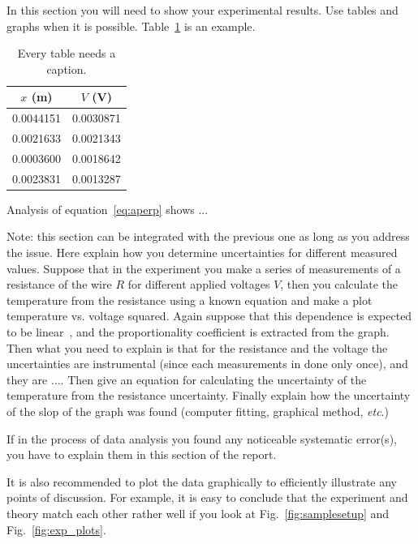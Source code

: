 \documentclass[letterpaper,12pt]{article}
\begin{document}
	In this section you will need to show your experimental results. Use tables and
	graphs when it is possible. Table~\ref{tbl:bins} is an example.
	
	\begin{table}[ht]
		\begin{center}
			\caption{Every table needs a caption.}
			\label{tbl:bins} %
			\begin{tabular}{|cc|} 
				\hline
				\multicolumn{1}{|c}{$x$ (m)} & \multicolumn{1}{c|}{$V$ (V)} \\
				\hline
				0.0044151 &   0.0030871 \\
				0.0021633 &   0.0021343 \\
				0.0003600 &   0.0018642 \\
				0.0023831 &   0.0013287 \\
				\hline
			\end{tabular}
		\end{center}
	\end{table}
	
	Analysis of equation~\ref{eq:aperp} shows ...
	
	Note: this section can be integrated with the previous one as long as you
	address the issue. Here explain how you determine uncertainties for different
	measured values. Suppose that in the experiment you make a series of
	measurements of a resistance of the wire $R$ for different applied voltages
	$V$, then you calculate the temperature from the resistance using a known
	equation and make a plot  temperature vs. voltage squared. Again suppose that
	this dependence is expected to be linear~\cite{Cyr}, and the proportionality coefficient
	is extracted from the graph. Then what you need to explain is that for the
	resistance and the voltage the uncertainties are instrumental (since each
	measurements in done only once), and they are $\dots$. Then give an equation
	for calculating the uncertainty of the temperature from the resistance
	uncertainty. Finally explain how the uncertainty of the slop of the graph was
	found (computer fitting, graphical method, \emph{etc}.)
	
	If in the process of data analysis you found any noticeable systematic
	error(s), you have to explain them in this section of the report.
	
	It is also recommended to plot the data graphically to efficiently illustrate
	any points of discussion. For example, it is easy to conclude that the
	experiment and theory match each other rather well if you look at
	Fig.~\ref{fig:samplesetup} and Fig.~\ref{fig:exp_plots}.
	
\end{document}
